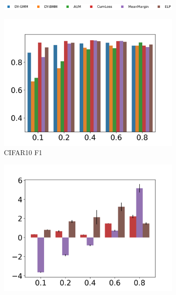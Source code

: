 \documentclass{article}
\begin{document}
\label{fdi:cifar10NE}
\begin{figure}[h]
\label{fig:rescifar10}
    \centering
    \begin{subfigure}[b]{.88\textwidth}
        \includegraphics[width=\textwidth]{figs/F1legend.png}
        \vspace{-.5cm}
    \end{subfigure}
    \begin{subfigure}[b]{0.22\textwidth}
        \includegraphics[width=\textwidth]{figs/c10f1bar.png}
        \vspace{-.5cm}
        \caption{CIFAR10 F1}
    \end{subfigure}
    \begin{subfigure}[b]{0.22\textwidth}
        \includegraphics[width=\textwidth]{figs/cifar10NE_bar_mae.png}

\end{subfigure}
\end{figure}
\end{document}
